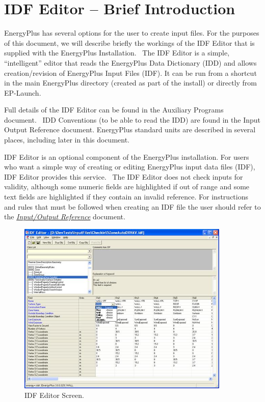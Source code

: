 \chapter{IDF Editor -- Brief Introduction}\label{idf-editor-brief-introduction}

EnergyPlus has several options for the user to create input files. For the purposes of this document, we will describe briefly the workings of the IDF Editor that is supplied with the EnergyPlus Installation.~ The IDF Editor is a simple, ``intelligent'' editor that reads the EnergyPlus Data Dictionary (IDD) and allows creation/revision of EnergyPlus Input Files (IDF). It can be run from a shortcut in the main EnergyPlus directory (created as part of the install) or directly from EP-Launch.

Full details of the IDF Editor can be found in the Auxiliary Programs document.~ IDD Conventions (to be able to read the IDD) are found in the Input Output Reference document. EnergyPlus standard units are described in several places, including later in this document.

IDF Editor is an optional component of the EnergyPlus installation. For users who want a simple way of creating or editing EnergyPlus input data files (IDF), IDF Editor provides this service.~ The IDF Editor does not check inputs for validity, although some numeric fields are highlighted if out of range and some text fields are highlighted if they contain an invalid reference. For instructions and rules that must be followed when creating an IDF file the user should refer to the \href{../../EnergyPlusFromStarTeam/EnergyPlusFromStarTeam/Documentation/sources/InputOutputReference.pdf}{\emph{Input/Output Reference}} document.

\begin{figure}[hbtp] %
\centering
\includegraphics[width=0.9\textwidth, height=0.9\textheight, keepaspectratio=true]{media/image021.jpg}
\caption{IDF Editor Screen. \protect \label{fig:idf-editor-screen.}}
\end{figure}

